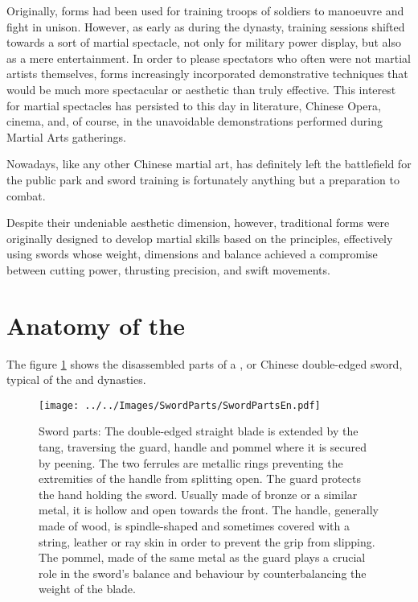 Originally, forms had been used for training troops of soldiers to manoeuvre and fight in unison. However, as early as during the \Tang{} dynasty, training sessions shifted towards a sort of martial spectacle, not only for military power display, but also as a mere entertainment. 
In order to please spectators who often were not martial artists themselves, forms increasingly incorporated demonstrative techniques that would be much more spectacular or aesthetic than truly effective.
This interest for martial spectacles has persisted to this day in literature, Chinese Opera, cinema, and, of course, in the unavoidable demonstrations performed during Martial Arts gatherings.

Nowadays, like any other Chinese martial art, \Taijijian{} has definitely left the battlefield for the public park and sword training is fortunately anything but a preparation to combat.

Despite their undeniable aesthetic dimension, however, traditional \Taijijian{} forms were originally designed to develop martial skills based on the \Taiji{} principles, effectively using swords whose weight, dimensions and balance achieved a compromise between cutting power, thrusting precision, and swift movements.

\section{Anatomy of the \Jian{}}
The figure \ref{fig:sword_parts} shows the disassembled parts of a \Jian{}, or Chinese double-edged sword, typical of the \Ming{} and \Qing{} dynasties. 

\begin{figure}[ht]
\centering
	\texttt{[image: ../../Images/SwordParts/SwordPartsEn.pdf]}
	\caption[Sword parts]{Sword parts: The double-edged straight blade is extended by the tang, traversing the guard, handle and pommel where it is secured by peening. The two ferrules are metallic rings preventing the extremities of the handle from splitting open. The guard protects the hand holding the sword. Usually made of bronze or a similar metal, it is hollow and open towards the front. The handle, generally made of wood, is spindle-shaped and sometimes covered with a string, leather or ray skin in order to prevent the grip from slipping.
The pommel, made of the same metal as the guard plays a crucial role in the sword's balance and behaviour by counterbalancing the weight of the blade.}
	\label{fig:sword_parts}
\end{figure}

